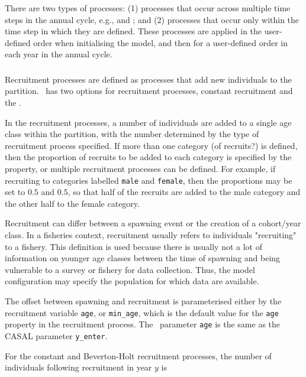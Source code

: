 There are two types of processes: (1) processes that occur across multiple time steps in the annual cycle, e.g.,  and ; and (2) processes that occur only within the time step in which they are defined. These processes are applied in the user-defined order when initialising the model, and then for a user-defined order in each year in the annual cycle.

\subsubsection{}

Recruitment processes are defined as processes that add new individuals to the partition. \CNAME\ has two options for recruitment processes, constant recruitment and the  \citep{1203}.

In the recruitment processes, a number of individuals are added to a single age class within the partition, with the number determined by the type of recruitment process specified. If more than one category (of recruits?) is defined, then the proportion of recruits to be added to each category is specified by the  property, or multiple recruitment processes can be defined. For example, if recruiting to categories labelled \texttt{male} and \texttt{female}, then the proportions may be set to $0.5$ and $0.5$, so that half of the recruits are added to the male category and the other half to the female category.

Recruitment can differ between a spawning event or the creation of a cohort/year class. In a fisheries context, recruitment usually refers to individuals "recruiting" to a fishery. This definition is used because there is usually not a lot of information on younger age classes between the time of spawning and being vulnerable to a survey or fishery for data collection. Thus, the model configuration may specify the population for which data are available.

The offset between spawning and recruitment is parameterised either by the recruitment variable \texttt{age}, or \texttt{min\_age}, which is the default value for the \texttt{age} property in the recruitment process. The \CNAME\ parameter \texttt{age} is the same as the CASAL parameter \texttt{y\_enter}.

For the constant and Beverton-Holt recruitment processes, the  number of individuals following recruitment in year $y$ is

